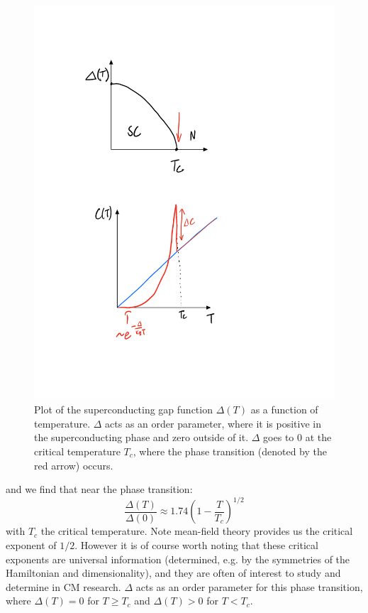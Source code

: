 \begin{figure}[htbp!]
    \centering
    \includegraphics[scale=0.7]{Images/fig-scdelta.pdf}
    \caption{Plot of the superconducting gap function $\Delta(T)$ as a function of temperature. $\Delta$ acts as an order parameter, where it is positive in the superconducting phase and zero outside of it. $\Delta$ goes to 0 at the critical temperature $T_c$, where the phase transition (denoted by the red arrow) occurs.}
    \label{fig-scdelta}
\end{figure}

and we find that near the phase transition:
\begin{equation}
    \frac{\Delta(T)}{\Delta(0)} \approx 1.74\left(1 - \frac{T}{T_c}\right)^{1/2}
\end{equation}
with $T_c$ the critical temperature. Note mean-field theory provides us the critical exponent of $1/2$. However it is of course worth noting that these critical exponents are universal information (determined, e.g. by the symmetries of the Hamiltonian and dimensionality), and they are often of interest to study and determine in CM research. $\Delta$ acts as an order parameter for this phase transition, where $\Delta(T) = 0$ for $T \geq T_c$ and $\Delta(T) > 0$ for $T < T_c$.

